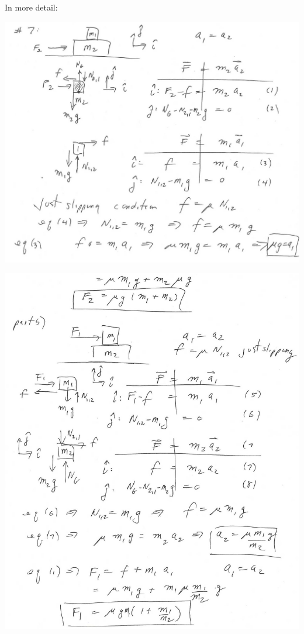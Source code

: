 \documentclass[solutions]{esg8012pset}
\begin{document}
  \noindent In more detail:
  \begin{center}\includegraphics[width=\textwidth]{ps02_Solution_Problem_3_0}\end{center}
  \begin{center}\includegraphics[width=\textwidth]{ps02_Solution_Problem_3_1}\end{center}
\end{document}
